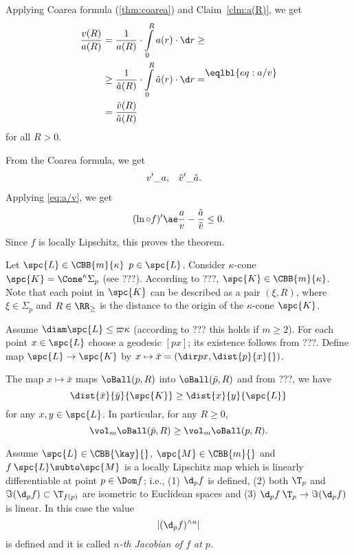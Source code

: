 Applying Coarea formula (\ref{thm:coarea}) and Claim~\ref{clm:a(R)},
we get
\[
\begin{aligned}
\frac{v(R)}{a(R)}
&=
\frac1{a(R)}
\cdot
\int\limits_0^R a(r)\cdot\d r
\ge
\\
&\ge \frac{1}{\tilde a(R)}\cdot \int\limits_0^R \tilde a(r)\cdot\d r
=
\\
&=
\frac{\tilde v(R)}{\tilde a(R)}
\end{aligned}
\eqlbl{eq:a/v}
\]
for all $R>0$.

From the Coarea formula, we get 
\begin{align*}
v'&\ae a, & \tilde v'&\ae\tilde a. 
\end{align*}
Applying  \ref{eq:a/v}, 
we get
\[(\ln\circ f)'
\ae
\frac{a}{v}-\frac{\tilde a}{\tilde v}
\le 0.
\]
Since $f$ is locally Lipschitz, this proves the theorem.

Let $\spc{L}\in\CBB{m}{\kappa}$
$p\in \spc{L}$.
Consider $\kappa$-cone $\spc{K}=\Cone^\kappa\Sigma_p$
(see ???).
According to ???, $\spc{K}\in\CBB{m}{\kappa}$.
Note that each point in $\spc{K}$ can be described as a pair 
$(\xi,R)$, where $\xi\in\Sigma_p$ and $R\in\RR_\ge$ is the distance to the origin of the $\kappa$-cone $\spc{K}$.

Assume $\diam \spc{L}\le \varpi\kappa$
(according to ??? this holds if $m\ge 2$).
For each point $x\in\spc{L}$ choose a geodesic $[px]$;
its existence follows from ???.
Define map
$\spc{L}\to\spc{K}$
by $x\mapsto\bar x=(\dir px,\dist{p}{x}{})$.

The map $x\mapsto \bar x$ maps $\oBall(p,R)$ into $\oBall(\bar p,R)$ and from ???, we have 
\[\dist{\bar x}{\bar y}{\spc{K}}
\ge 
\dist{x}{y}{\spc{L}}\]
for any $x,y\in \spc{L}$.
In particular, for any $R\ge 0$,
\[\vol_m \oBall(\bar p,R)\ge \vol_m \oBall(p,R).\]



















Assume $\spc{L}\in \CBB{\kay}{}$, $\spc{M}\in\CBB{m}{}$
and $f\:\spc{L}\subto \spc{M}$ is a locally Lipschitz map which is linearly differentiable at point $p\in\Dom f$;
i.e., 
(1) $\d_p f$ is defined,
(2) both $\T_p$ and $\Im(\d_pf)\subset \T_{f(p)}$ are isometric to Euclidean spaces
and (3) $\d_p f\:\T_p\to \Im(\d_pf)$ is linear.
In this case the value
\[|(\d_pf)^{\wedge n}|\]
is defined and it is called
\emph{$n$-th Jacobian of $f$ at $p$}.

